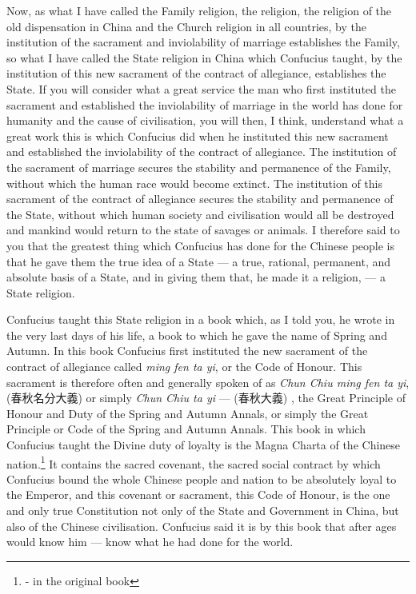 Now, as what I have called the Family religion, the religion, the religion of the old dispensation in China and the Church religion in all countries, by the institution of the sacrament and inviolability of marriage establishes the Family, so what I have called the State religion in China which Confucius taught, by the institution of this new sacrament of the contract of allegiance, establishes the State. 
If you will consider what a great service the man who first instituted the sacrament and established the inviolability of marriage in the world has done for humanity and the cause of civilisation, you will then, I think, understand what a great work this is which Confucius did when he instituted this new sacrament and established the inviolability of the contract of allegiance.
The institution of the sacrament of marriage secures the stability and permanence of the Family, without which the human race would become extinct.
The institution of this sacrament of the contract of allegiance secures the stability and permanence of the State, without which human society and civilisation would all be destroyed  and mankind would return to the state of savages or animals.
I therefore said to you that the greatest thing which Confucius has done for the Chinese people is that he gave them the true idea of a State --- a true, rational, permanent, and absolute basis of a State, and in giving them that, he made it a religion, --- a State religion.

Confucius taught this State religion in a book which, as I told you, he wrote in the very last days of his life, a book to which he gave the name of Spring and Autumn.
In this book Confucius first instituted the new sacrament of the contract of allegiance called \emph{ming fen ta yi}, or the Code of Honour.
This sacrament is therefore often and generally spoken of as \emph{Chun Chiu ming fen ta yi}, (春秋名分大義) or simply \emph{Chun Chiu ta yi} --- (春秋大義) \ie, the Great Principle of Honour and Duty of the Spring and Autumn Annals, or simply the Great Principle or Code of the Spring and Autumn Annals.
This book in which Confucius taught the Divine duty of loyalty is the Magna Charta  of the Chinese nation.\footnote{- in the original book} It contains the sacred covenant, the sacred social contract by which Confucius bound the whole Chinese people and nation to be absolutely loyal to the Emperor, and this covenant or sacrament, this Code of Honour, is the one and only true Constitution not only of the State and Government in China, but also of the Chinese civilisation.
Confucius said it is by this book that after ages would know him --- know what he had done for the world.

